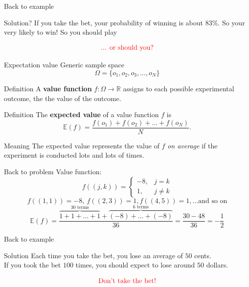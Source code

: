 \documentclass{beamer}
\begin{document}
\begin{frame}{Back to example}
  \begin{block}{Solution?}
\pause
    If you take the bet, your probability of winning is about $83\%$.
\pause
    So your very likely to win!  So you should play
  \end{block}
\pause
  $$\text{{\color{red}... or should you?}}$$
\end{frame}

\begin{frame}{Expectation value}
  Generic sample space
  $$\Omega = \{o_1,o_2,o_3,\dots,o_N\}$$
\pause
  \begin{block}{Definition}
\pause
    A \textbf{value function} $f: \Omega\rightarrow\mathbb R$ assigns to each possible experimental outcome, the the value of the outcome.
  \end{block}
\pause
  \begin{block}{Definition}
\pause
    The \textbf{expected value} of a value function $f$ is
    $$\mathbb E(f) = \frac{f(o_1)+f(o_2)+\dots+f(o_N)}{N}.$$
  \end{block}
\pause
  \begin{block}{Meaning}
\pause
    The expected value represents the value of $f$ \emph{on average} if the experiment is conducted lots and lots of times.
  \end{block}
\end{frame}

\begin{frame}{Back to problem}
\pause
  Value function:
  $$f((j,k)) = \left\lbrace\begin{array}{cc}-8, & j=k\\1, & j\neq k\end{array}\right.$$
\pause
  $$f((1,1)) = -8,\ f((2,3)) = 1, f((4,5)) = 1,\dots\text{and so on}$$
\pause
  $$\mathbb E(f) = \frac{\overbrace{1+1 + \dots + 1}^{\text{30 terms}} + \overbrace{(-8) + \dots + (-8)}^{\text{6 terms}}}{36} = \frac{30-48}{36} = -\frac{1}{2}$$
\end{frame}

\begin{frame}{Back to example}
\pause
  \begin{block}{Solution}
\pause
    Each time you take the bet, you lose an average of $50$ cents.\\
\pause
    If you took the bet $100$ times, you should expect to lose around $50$ dollars.
  \end{block}
\pause
  $$\text{{\color{red}Don't take the bet!}}$$
\end{frame}
\end{document}

